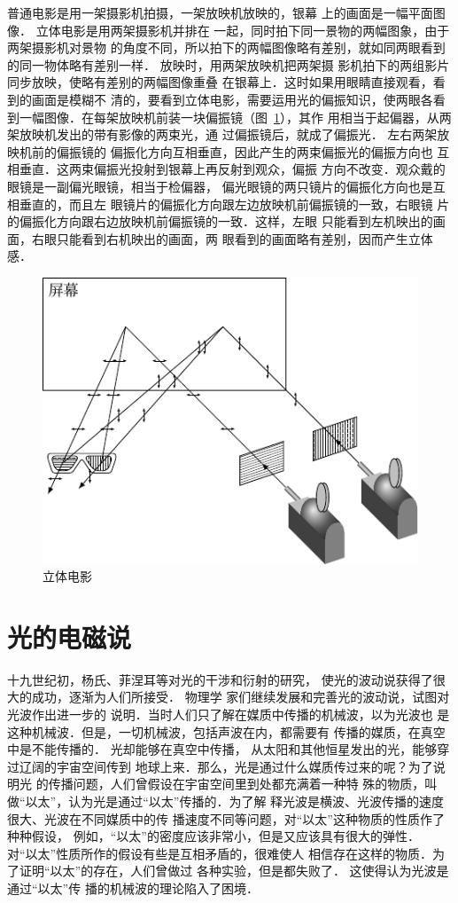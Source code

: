 普通电影是用一架摄影机拍摄，一架放映机放映的，银幕
上的画面是一幅平面图像．
立体电影是用两架摄影机并排在
一起，同时拍下同一景物的两幅图象，由于两架摄影机对景物
的角度不同，所以拍下的两幅图像略有差别，就如同两眼看到
的同一物体略有差别一样．
放映时，用两架放映机把两架摄
影机拍下的两组影片同步放映，使略有差别的两幅图像重叠
在银幕上．这时如果用眼睛直接观看，看到的画面是模糊不
清的，要看到立体电影，需要运用光的偏振知识，使两眼各看
到一幅图像．在每架放映机前装一块偏振镜（图~\ref{fig_C_6-15}），其作
用相当于起偏器，从两架放映机发出的带有影像的两束光，通
过偏振镜后，就成了偏振光．
左右两架放映机前的偏振镜的
偏振化方向互相垂直，因此产生的两束偏振光的偏振方向也
互相垂直．这两束偏振光投射到银幕上再反射到观众，偏振
方向不改变．观众戴的眼镜是一副偏光眼镜，相当于检偏器，
偏光眼镜的两只镜片的偏振化方向也是互相垂直的，而且左
眼镜片的偏振化方向跟左边放映机前偏振镜的一致，右眼镜
片的偏振化方向跟右边放映机前偏振镜的一致．这样，左眼
只能看到左机映出的画面，右眼只能看到右机映出的画面，两
眼看到的画面略有差别，因而产生立体感．
\begin{figure}[htbp]
    \centering
    \includegraphics{fig/C/6-15.pdf}
    \caption{立体电影}\label{fig_C_6-15}
\end{figure}

\section{光的电磁说}
十九世纪初，杨氏、菲涅耳等对光的干涉和衍射的研究，
使光的波动说获得了很大的成功，逐渐为人们所接受．
物理学
家们继续发展和完善光的波动说，试图对光波作出进一步的
说明．当时人们只了解在媒质中传播的机械波，以为光波也
是这种机械波．但是，一切机械波，包括声波在内，都需要有
传播的媒质，在真空中是不能传播的．
光却能够在真空中传播，
从太阳和其他恒星发出的光，能够穿过辽阔的宇宙空间传到
地球上来．那么，光是通过什么媒质传过来的呢？为了说明光
的传播问题，人们曾假设在宇宙空间里到处都充满着一种特
殊的物质，叫做“以太”，认为光是通过“以太”传播的．为了解
释光波是横波、光波传播的速度很大、光波在不同媒质中的传
播速度不同等问题，对“以太”这种物质的性质作了种种假设，
例如，“以太”的密度应该非常小，但是又应该具有很大的弹性．
对“以太”性质所作的假设有些是互相矛盾的，很难使人
相信存在这样的物质．为了证明“以太”的存在，人们曾做过
各种实验，但是都失败了．
这使得认为光波是通过“以太”传
播的机械波的理论陷入了困境．

